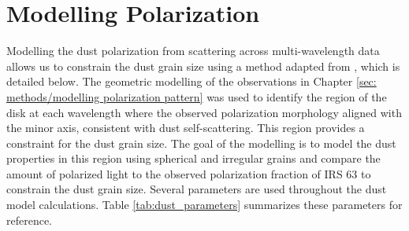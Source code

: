 
\chapter{Modelling Polarization}
\label{sec: ch5_DustScatteringModels}



Modelling the dust polarization from scattering across multi-wavelength data allows us to constrain the dust grain size using a method adapted from \cite{Zhang2023}, which is detailed below. The geometric modelling of the observations in Chapter \ref{sec: methods/modelling polarization pattern} was used to identify the region of the disk at each wavelength where the observed polarization morphology aligned with the minor axis, consistent with dust self-scattering. This region provides a constraint for the dust grain size. The goal of the modelling is to model the dust properties in this region using spherical and irregular grains and compare the amount of polarized light to the observed polarization fraction of IRS 63 to constrain the dust grain size. Several parameters are used throughout the dust model calculations. Table \ref{tab:dust_parameters} summarizes these parameters for reference. 



